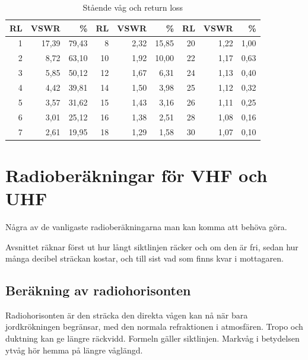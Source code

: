 \begin{table}[H]
\centering
\begin{tabular}{rrr|rrr|rrr}
	\textbf{RL} & \textbf{VSWR} & \textbf{\%} & \textbf{RL} & \textbf{VSWR} & \textbf{\%} & \textbf{RL} & \textbf{VSWR} & \textbf{\%} \\ \hline
	          1 &         17,39 &       79,43 &           8 &          2,32 &       15,85 &          20 &          1,22 &        1,00 \\
	          2 &          8,72 &       63,10 &          10 &          1,92 &       10,00 &          22 &          1,17 &        0,63 \\
	          3 &          5,85 &       50,12 &          12 &          1,67 &        6,31 &          24 &          1,13 &        0,40 \\
	          4 &          4,42 &       39,81 &          14 &          1,50 &        3,98 &          25 &          1,12 &        0,32 \\
	          5 &          3,57 &       31,62 &          15 &          1,43 &        3,16 &          26 &          1,11 &        0,25 \\
	          6 &          3,01 &       25,12 &          16 &          1,38 &        2,51 &          28 &          1,08 &        0,16 \\
	          7 &          2,61 &       19,95 &          18 &          1,29 &        1,58 &          30 &          1,07 &        0,10
\end{tabular}
\caption{Stående våg och return loss}
\label{tab:vswr-rl}
\end{table}

\section{Radioberäkningar för VHF och UHF}

Några av de vanligaste radioberäkningarna man kan komma att behöva göra.

Avsnittet räknar först ut hur långt siktlinjen räcker och om den är fri,
sedan hur många decibel sträckan kostar, och till sist vad som finns kvar
i mottagaren.

\subsection{Beräkning av radiohorisonten}

Radiohorisonten är den sträcka den direkta vågen kan nå när bara
jordkrökningen begränsar, med den normala refraktionen i atmosfären.
Tropo och duktning kan ge längre räckvidd. Formeln gäller siktlinjen.
Markvåg i betydelsen ytvåg hör hemma på längre våglängd.

